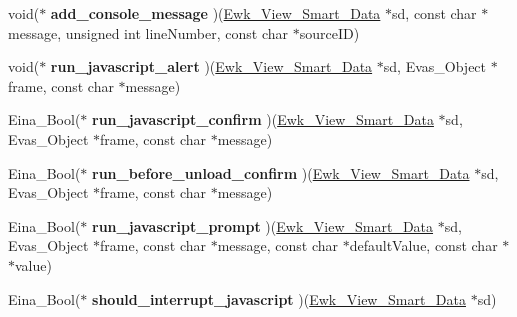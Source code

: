 \begin{DoxyCompactItemize}
\item 
\hypertarget{struct__Ewk__View__Smart__Class_a0ae37e5777fb49cc6af2aa9dd4c585e5}{void($\ast$ {\bfseries add\+\_\+console\+\_\+message} )(\hyperlink{ewk__view_8h_a9a4bd081861301f6c55cb5da384dfc7d}{Ewk\+\_\+\+View\+\_\+\+Smart\+\_\+\+Data} $\ast$sd, const char $\ast$message, unsigned int line\+Number, const char $\ast$source\+I\+D)}\label{struct__Ewk__View__Smart__Class_a0ae37e5777fb49cc6af2aa9dd4c585e5}

\item 
\hypertarget{struct__Ewk__View__Smart__Class_ad69d8c05004e8dc86fa52aa82071dff3}{void($\ast$ {\bfseries run\+\_\+javascript\+\_\+alert} )(\hyperlink{ewk__view_8h_a9a4bd081861301f6c55cb5da384dfc7d}{Ewk\+\_\+\+View\+\_\+\+Smart\+\_\+\+Data} $\ast$sd, Evas\+\_\+\+Object $\ast$frame, const char $\ast$message)}\label{struct__Ewk__View__Smart__Class_ad69d8c05004e8dc86fa52aa82071dff3}

\item 
\hypertarget{struct__Ewk__View__Smart__Class_a7c59d7a041594242ffd89808db7f3ef9}{Eina\+\_\+\+Bool($\ast$ {\bfseries run\+\_\+javascript\+\_\+confirm} )(\hyperlink{ewk__view_8h_a9a4bd081861301f6c55cb5da384dfc7d}{Ewk\+\_\+\+View\+\_\+\+Smart\+\_\+\+Data} $\ast$sd, Evas\+\_\+\+Object $\ast$frame, const char $\ast$message)}\label{struct__Ewk__View__Smart__Class_a7c59d7a041594242ffd89808db7f3ef9}

\item 
\hypertarget{struct__Ewk__View__Smart__Class_ababfd2424aceb2c87227a0ca88c2dfa5}{Eina\+\_\+\+Bool($\ast$ {\bfseries run\+\_\+before\+\_\+unload\+\_\+confirm} )(\hyperlink{ewk__view_8h_a9a4bd081861301f6c55cb5da384dfc7d}{Ewk\+\_\+\+View\+\_\+\+Smart\+\_\+\+Data} $\ast$sd, Evas\+\_\+\+Object $\ast$frame, const char $\ast$message)}\label{struct__Ewk__View__Smart__Class_ababfd2424aceb2c87227a0ca88c2dfa5}

\item 
\hypertarget{struct__Ewk__View__Smart__Class_a037a42601ff1857d186cd9d41289bd3f}{Eina\+\_\+\+Bool($\ast$ {\bfseries run\+\_\+javascript\+\_\+prompt} )(\hyperlink{ewk__view_8h_a9a4bd081861301f6c55cb5da384dfc7d}{Ewk\+\_\+\+View\+\_\+\+Smart\+\_\+\+Data} $\ast$sd, Evas\+\_\+\+Object $\ast$frame, const char $\ast$message, const char $\ast$default\+Value, const char $\ast$$\ast$value)}\label{struct__Ewk__View__Smart__Class_a037a42601ff1857d186cd9d41289bd3f}

\item 
\hypertarget{struct__Ewk__View__Smart__Class_a7828a1c157181889312245fac93775f5}{Eina\+\_\+\+Bool($\ast$ {\bfseries should\+\_\+interrupt\+\_\+javascript} )(\hyperlink{ewk__view_8h_a9a4bd081861301f6c55cb5da384dfc7d}{Ewk\+\_\+\+View\+\_\+\+Smart\+\_\+\+Data} $\ast$sd)}\label{struct__Ewk__View__Smart__Class_a7828a1c157181889312245fac93775f5}


\end{DoxyCompactItemize}
